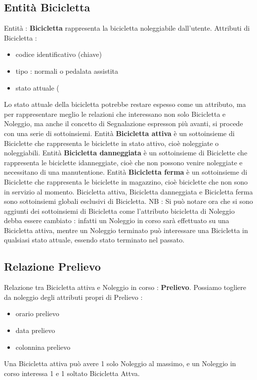 \documentclass[a4paper,twoside]{article}
\begin{document}
\subsection{Entità Bicicletta}
Entità : \textbf{Bicicletta} rappresenta la bicicletta noleggiabile dall'utente.\newline
Attributi di Bicicletta :
\begin{itemize}
 \item codice identificativo (chiave)
 \item tipo : normali o pedalata assistita
 \item stato attuale (
\end{itemize}
Lo stato attuale della bicicletta potrebbe restare espesso come un attributo, ma per rappresentare meglio le relazioni che interessano non solo Bicicletta e Noleggio, ma anche il concetto di Segnalazione espresson più avanti, si procede con una serie di sottoinsiemi.\newline
Entità \textbf{Bicicletta attiva} è un sottoinsieme di Biciclette che rappresenta le biciclette in stato attivo, cioè noleggiate o noleggiabili.\newline
Entità \textbf{Bicicletta danneggiata} è un sottoinsieme di Biciclette che rappresenta le biciclette idanneggiate, cioè che non possono venire noleggiate e necessitano di una manutentione.\newline
Entità \textbf{Bicicletta ferma} è un sottoinsieme di Biciclette che rappresenta le biciclette in magazzino, cioè biciclette che non sono in servizio al momento.\newline
Bicicletta attiva, Bicicletta danneggiata e Bicicletta ferma sono sottoinsiemi globali esclusivi di Bicicletta.\newline
NB :\newline
Si può notare ora che si sono aggiunti dei sottoinsiemi di Bicicletta come l'attributo bicicletta di Noleggio debba essere cambiato : infatti un Noleggio in corso sarà effettuato su una Bicicletta attiva, mentre un Noleggio terminato può interessare una Bicicletta in qualsiasi stato attuale, essendo stato terminato nel passato.

\subsection{Relazione Prelievo}
Relazione tra Bicicletta attiva e Noleggio in corso : \textbf{Prelievo}.\newline
Possiamo togliere da noleggio degli attributi propri di Prelievo :
\begin{itemize}
 \item orario prelievo
 \item data prelievo
 \item colonnina prelievo
\end{itemize}
Una Bicicletta attiva può avere 1 solo Noleggio al massimo, e un Noleggio in corso interessa 1 e 1 soltato Bicicletta Attva.
\end{document}
